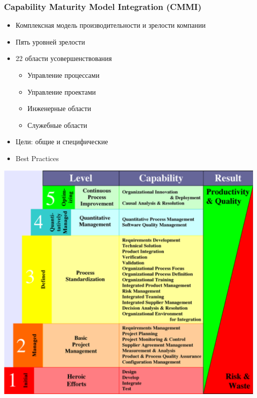 \documentclass{../../slides-style}
\begin{document}
    \begin{frame}
        \frametitle{Capability Maturity Model Integration (CMMI)}
        \begin{itemize}
            \item Комплексная модель производительности и зрелости компании
            \item Пять уровней зрелости
            \item 22 области усовершенствования
            \begin{itemize}
                \item Управление процессами
                \item Управление проектами
                \item Инженерные области
                \item Служебные области
            \end{itemize}
            \item Цели: общие и специфические
            \item Best Practices
        \end{itemize}
    \end{frame}

    \begin{frame}
        \begin{center}
            \includegraphics[height=0.95\textheight]{cmmi.png}
        \end{center}
    \end{frame}
\end{document}
